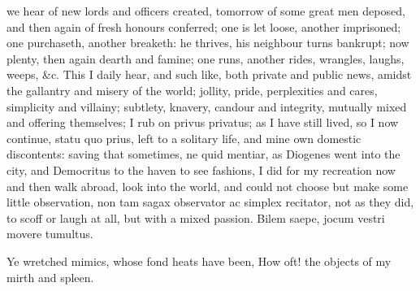 {we hear of new lords and officers created, tomorrow of some great men
deposed, and then again of fresh honours conferred; one is let loose,
another imprisoned; one purchaseth, another breaketh: he thrives, his
neighbour turns bankrupt; now plenty, then again dearth and famine; one
runs, another rides, wrangles, laughs, weeps, \&c. This I daily hear,
and such like, both private and public news, amidst the gallantry and
misery of the world; jollity, pride, perplexities and cares, simplicity
and villainy; subtlety, knavery, candour and integrity, mutually mixed
and offering themselves; I rub on privus privatus; as I have still
lived, so I now continue, statu quo prius, left to a solitary life, and
mine own domestic discontents: saving that sometimes, ne quid mentiar,
as Diogenes went into the city, and Democritus to the haven to see
fashions, I did for my recreation now and then walk abroad, look into
the world, and could not choose but make some little observation, non
tam sagax observator ac simplex recitator,  not as they did, to
scoff or laugh at all, but with a mixed passion.
Bilem saepe, jocum vestri movere tumultus.

Ye wretched mimics, whose fond heats have been,
How oft! the objects of my mirth and spleen.

}
